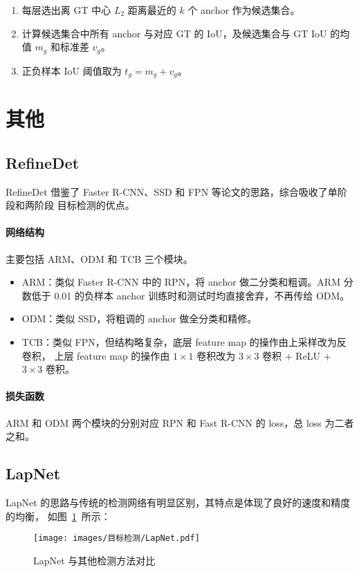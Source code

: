 \begin{enumerate}
  \item 每层选出离 GT 中心 $L_2$ 距离最近的 $k$ 个 anchor 作为候选集合。
  \item 计算候选集合中所有 anchor 与对应 GT 的 IoU，及候选集合与 GT IoU 的均值 $m_g$ 和标准差 $v_g$。
  \item 正负样本 IoU 阈值取为 $t_g = m_g + v_g$。
\end{enumerate}

\section{其他}

\subsection{RefineDet}
RefineDet 借鉴了 Faster R-CNN、SSD 和 FPN 等论文的思路，综合吸收了单阶段和两阶段
目标检测的优点。

\paragraph{网络结构}
主要包括 ARM、ODM 和 TCB 三个模块。
\begin{itemize}
  \item ARM：类似 Faster R-CNN 中的 RPN，将 anchor 做二分类和粗调。ARM 分数低于
    0.01 的负样本 anchor 训练时和测试时均直接舍弃，不再传给 ODM。
  \item ODM：类似 SSD，将粗调的 anchor 做全分类和精修。
  \item TCB：类似 FPN，但结构略复杂，底层 feature map 的操作由上采样改为反卷积，
    上层 feature map 的操作由 $1 \times 1$ 卷积改为 $3 \times 3$ 卷积 + ReLU +
    $3 \times 3$ 卷积。
\end{itemize}

\paragraph{损失函数}
ARM 和 ODM 两个模块的分别对应 RPN 和 Fast R-CNN 的 loss，总 loss 为二者之和。

\subsection{LapNet}
LapNet 的思路与传统的检测网络有明显区别，其特点是体现了良好的速度和精度的均衡，
如图~\ref{fig:LapNet}~所示：

\begin{figure}[ht]
  \centering
  \texttt{[image: images/目标检测/LapNet.pdf]}
  \caption{LapNet 与其他检测方法对比}
  \label{fig:LapNet}
\end{figure}

